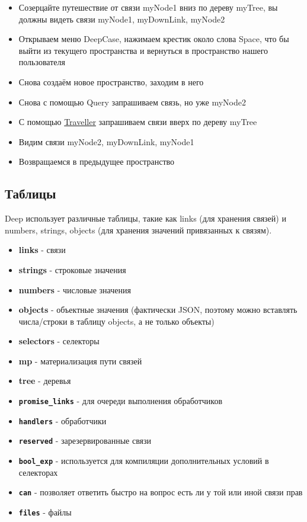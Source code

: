 \documentclass{article}
\begin{document}
\begin{itemize}
  \item Созерцайте путешествие от связи myNode1 вниз по дереву myTree, вы должны видеть связи myNode1, myDownLink, myNode2
  \item Открываем меню DeepCase, нажимаем крестик около слова Space, что бы выйти из текущего пространства и вернуться в пространство нашего пользователя
  \item Снова создаём новое пространство, заходим в него
  \item Снова с помощью Query запрашиваем связь, но уже myNode2
  \item С помощью \hyperlink{Traveller.Def}{Traveller} запрашиваем связи вверх по дереву myTree
  \item Видим связи myNode2, myDownLink, myNode1
  \item Возвращаемся в предыдущее пространство
\end{itemize}

\subsection{Таблицы}
Deep использует различные таблицы, такие как links (для хранения связей) и
numbers, strings, objects (для хранения значений привязанных к связям).

\begin{itemize}
  \item \textbf{links} - связи
  \item \textbf{strings} - строковые значения
  \item \textbf{numbers} - числовые значения
  \item \textbf{objects} - объектные значения (фактически JSON, поэтому можно
        вставлять числа/строки в таблицу objects, а не только объекты)
  \item \textbf{selectors} - селекторы
  \item \textbf{mp} - материализация пути связей
  \item \textbf{tree} - деревья
  \item \textbf{\texttt{promise\_links}} - для очереди выполнения обработчиков
  \item \textbf{\texttt{handlers}} - обработчики
  \item \textbf{\texttt{reserved}} - зарезервированные связи
  \item \textbf{\texttt{bool\_exp}} - используется для компиляции
        дополнительных условий в селекторах
  \item \textbf{\texttt{can}} - позволяет ответить быстро на вопрос есть ли у
        той или иной связи прав
  \item \textbf{\texttt{files}} - файлы
\end{itemize}
\end{document}
